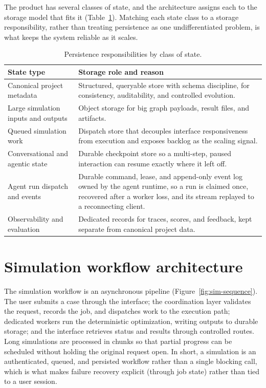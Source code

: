 The product has several classes of state, and the architecture assigns each to the
storage model that fits it (Table~\ref{tab:storage}). Matching each state class to
a storage responsibility, rather than treating persistence as one undifferentiated
problem, is what keeps the system reliable as it scales.

\begin{table}[H]
  \centering
  \begin{tabularx}{\linewidth}{@{}
      >{\raggedright\arraybackslash}p{3.6cm}
      >{\raggedright\arraybackslash}X @{}}
    \toprule
    \textbf{State type} & \textbf{Storage role and reason} \\
    \midrule
    Canonical project metadata & Structured, queryable store with schema
      discipline, for consistency, auditability, and controlled evolution. \\
    \addlinespace
    Large simulation inputs and outputs & Object storage for big graph payloads,
      result files, and artifacts. \\
    \addlinespace
    Queued simulation work & Dispatch store that decouples interface
      responsiveness from execution and exposes backlog as the scaling signal. \\
    \addlinespace
    Conversational and agentic state & Durable checkpoint store so a multi-step,
      paused interaction can resume exactly where it left off. \\
    \addlinespace
    Agent run dispatch and events & Durable command, lease, and append-only event
      log owned by the agent runtime, so a run is claimed once, recovered after a
      worker loss, and its stream replayed to a reconnecting client. \\
    \addlinespace
    Observability and evaluation & Dedicated records for traces, scores, and
      feedback, kept separate from canonical project data. \\
    \bottomrule
  \end{tabularx}
  \caption{Persistence responsibilities by class of state.}
  \label{tab:storage}
\end{table}

\section{Simulation workflow architecture}
\label{sec:simworkflow}

The simulation workflow is an asynchronous pipeline
(Figure~\ref{fig:sim-sequence}). The user submits a case
through the interface; the coordination layer validates the request, records the
job, and dispatches work to the execution path; dedicated workers run the
deterministic optimization, writing outputs to durable storage; and the interface
retrieves status and results through controlled routes. Long simulations are
processed in chunks so that partial progress can be scheduled without holding the
original request open. In short, a simulation is an authenticated, queued, and
persisted workflow rather than a single blocking call, which is what makes failure
recovery explicit (through job state) rather than tied to a user session.

